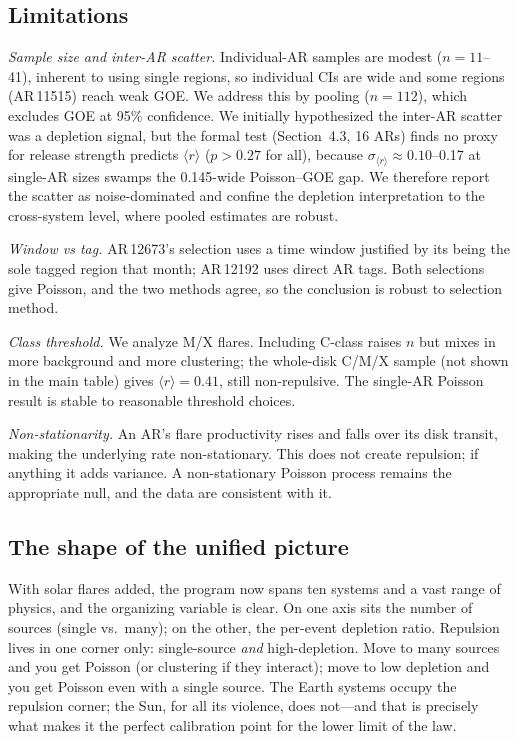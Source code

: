 \documentclass[12pt,a4paper]{article}
\begin{document}
\subsection{Limitations}

\emph{Sample size and inter-AR scatter.} Individual-AR samples are modest ($n=11$--41), inherent to using single regions, so individual CIs are wide and some regions (AR\,11515) reach weak GOE. We address this by pooling ($n=112$), which excludes GOE at 95\% confidence. We initially hypothesized the inter-AR scatter was a depletion signal, but the formal test (Section~4.3, 16 ARs) finds no proxy for release strength predicts $\langle r\rangle$ ($p>0.27$ for all), because $\sigma_{\langle r\rangle}\approx0.10$--0.17 at single-AR sizes swamps the 0.145-wide Poisson--GOE gap. We therefore report the scatter as noise-dominated and confine the depletion interpretation to the cross-system level, where pooled estimates are robust.

\emph{Window vs tag.} AR\,12673's selection uses a time window justified by its being the sole tagged region that month; AR\,12192 uses direct AR tags. Both selections give Poisson, and the two methods agree, so the conclusion is robust to selection method.

\emph{Class threshold.} We analyze M/X flares. Including C-class raises $n$ but mixes in more background and more clustering; the whole-disk C/M/X sample (not shown in the main table) gives $\langle r\rangle=0.41$, still non-repulsive. The single-AR Poisson result is stable to reasonable threshold choices.

\emph{Non-stationarity.} An AR's flare productivity rises and falls over its disk transit, making the underlying rate non-stationary. This does not create repulsion; if anything it adds variance. A non-stationary Poisson process remains the appropriate null, and the data are consistent with it.

\subsection{The shape of the unified picture}

With solar flares added, the program now spans ten systems and a vast range of physics, and the organizing variable is clear. On one axis sits the number of sources (single vs.\ many); on the other, the per-event depletion ratio. Repulsion lives in one corner only: single-source \emph{and} high-depletion. Move to many sources and you get Poisson (or clustering if they interact); move to low depletion and you get Poisson even with a single source. The Earth systems occupy the repulsion corner; the Sun, for all its violence, does not---and that is precisely what makes it the perfect calibration point for the lower limit of the law.
\end{document}
